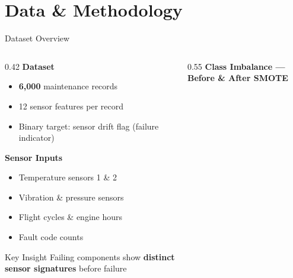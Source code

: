 \documentclass[aspectratio=169]{beamer}
\begin{document}
\section{Data \& Methodology}

\begin{frame}{Dataset Overview}

  \begin{columns}[T]
    \begin{column}{0.42\textwidth}
      \textbf{Dataset}
      \begin{itemize}
        \item \textbf{6,000} maintenance records
        \item 12 sensor features per record
        \item Binary target: sensor drift flag (failure indicator)
      \end{itemize}

      \vspace{0.3cm}

      \textbf{Sensor Inputs}
      \begin{itemize}
        \item Temperature sensors 1 \& 2
        \item Vibration \& pressure sensors
        \item Flight cycles \& engine hours
        \item Fault code counts
      \end{itemize}

      \vspace{0.3cm}

      \begin{exampleblock}{Key Insight}
        \small Failing components show \textbf{distinct sensor signatures} before failure
      \end{exampleblock}
    \end{column}

    \begin{column}{0.55\textwidth}
      \textbf{Class Imbalance --- Before \& After SMOTE}

      \vspace{0.3cm}

\end{column}
\end{columns}
\end{frame}
\end{document}
